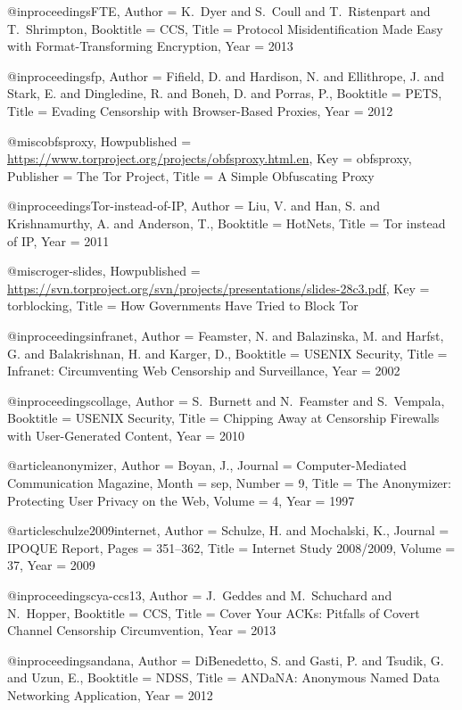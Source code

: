 {{@inproceedings{FTE,
	Author = {K.~Dyer and S.~Coull and T.~Ristenpart and T.~Shrimpton},
	Booktitle = {CCS},
	Title = {{Protocol Misidentification Made Easy with Format-Transforming Encryption}},
	Year = {2013}}

@inproceedings{fp,
	Author = {Fifield, D. and Hardison, N. and Ellithrope, J. and Stark, E. and Dingledine, R. and Boneh, D. and Porras, P.},
	Booktitle = {PETS},
	Title = {{Evading Censorship with Browser-Based Proxies}},
	Year = {2012}}

@misc{obfsproxy,
	Howpublished = {\url{https://www.torproject.org/projects/obfsproxy.html.en}},
	Key = {obfsproxy},
	Publisher = {The Tor Project},
	Title = {{A Simple Obfuscating Proxy}}}

@inproceedings{Tor-instead-of-IP,
	Author = {Liu, V. and Han, S. and Krishnamurthy, A. and Anderson, T.},
	Booktitle = {HotNets},
	Title = {{Tor instead of IP}},
	Year = {2011}}

@misc{roger-slides,
	Howpublished = {\url{https://svn.torproject.org/svn/projects/presentations/slides-28c3.pdf}},
	Key = {torblocking},
	Title = {{How Governments Have Tried to Block Tor}}}

@inproceedings{infranet,
	Author = {Feamster, N. and Balazinska, M. and Harfst, G. and Balakrishnan, H. and Karger, D.},
	Booktitle = {USENIX Security},
	Title = {{Infranet: Circumventing Web Censorship and Surveillance}},
	Year = {2002}}

@inproceedings{collage,
	Author = {S.~Burnett and N.~Feamster and S.~Vempala},
	Booktitle = {USENIX Security},
	Title = {{Chipping Away at Censorship Firewalls with User-Generated Content}},
	Year = {2010}}

@article{anonymizer,
	Author = {Boyan, J.},
	Journal = {Computer-Mediated Communication Magazine},
	Month = sep,
	Number = {9},
	Title = {{The Anonymizer: Protecting User Privacy on the Web}},
	Volume = {4},
	Year = {1997}}

@article{schulze2009internet,
	Author = {Schulze, H. and Mochalski, K.},
	Journal = {IPOQUE Report},
	Pages = {351--362},
	Title = {Internet Study 2008/2009},
	Volume = {37},
	Year = {2009}}

@inproceedings{cya-ccs13,
	Author = {J.~Geddes and M.~Schuchard and N.~Hopper},
	Booktitle = {{CCS}},
	Title = {{Cover Your ACKs: Pitfalls of Covert Channel Censorship Circumvention}},
	Year = {2013}}

@inproceedings{andana,
	Author = {DiBenedetto, S. and Gasti, P. and Tsudik, G. and Uzun, E.},
	Booktitle = {{NDSS}},
	Title = {{ANDaNA: Anonymous Named Data Networking Application}},
	Year = {2012}}

}}
